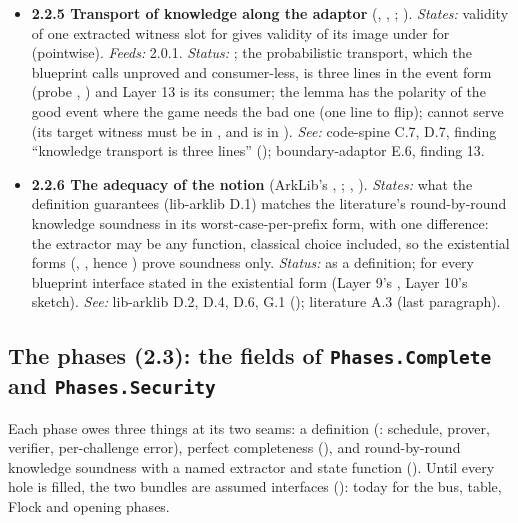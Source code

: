 \begin{itemize}[label={}, leftmargin=1.3em, itemindent=-1.3em, labelwidth=0pt, labelsep=0pt, itemsep=4pt, topsep=3pt]
\item {}\label{obl:node-2.2.5}\textbf{2.2.5 Transport of knowledge along the adaptor} (, , ; ). \emph{States:} validity of one extracted witness slot for  gives validity of its image under  for  (pointwise). \emph{Feeds:} 2.0.1. \emph{Status:} ; the probabilistic transport, which the blueprint calls unproved and consumer-less, is three lines in the event form (probe , ) and Layer 13 is its consumer; the lemma has the polarity of the good event where the game needs the bad one (one line to flip);  cannot serve (its target witness must be in , and  is in ). \emph{See:} code-spine C.7, D.7, finding ``knowledge transport is three lines'' (); boundary-adaptor E.6, finding 13.
\item {}\label{obl:node-2.2.6}\oblflag\textbf{2.2.6 The adequacy of the notion} (ArkLib's , ; , ). \emph{States:} what the definition guarantees (lib-arklib D.1) matches the literature's round-by-round knowledge soundness in its worst-case-per-prefix form, with one difference: the extractor may be any function, classical choice included, so the existential forms (, , hence ) prove soundness only. \emph{Status:}  as a definition;  for every blueprint interface stated in the existential form (Layer 9's , Layer 10's sketch). \emph{See:} lib-arklib D.2, D.4, D.6, G.1 (); literature A.3 (last paragraph).
\end{itemize}

\subsection[The phases (2.3)]{The phases (2.3): the fields of \texttt{Phases.Complete} and \texttt{Phases.Security}}\label{sec:obl-tier-phases}

Each phase owes three things at its two seams: a definition (: schedule, prover, verifier, per-challenge error), perfect completeness (), and round-by-round knowledge soundness with a named extractor and state function (). Until every hole is filled, the two bundles are assumed interfaces (): today  for the bus, table, Flock and opening phases.


